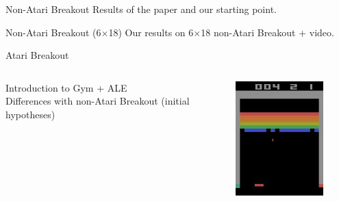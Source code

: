 \documentclass[10pt]{beamer}
\begin{document}
    \begin{frame}{Non-Atari Breakout}
        Results of the paper and our starting point.
    \end{frame}

    \begin{frame}{Non-Atari Breakout (6$\times$18)}
        Our results on 6$\times$18 non-Atari Breakout + video.
    \end{frame}

    \begin{frame}{Atari Breakout}
        \begin{columns}[c,onlytextwidth]
                Introduction to Gym + ALE\\
                Differences with non-Atari Breakout (initial hypotheses)
                \begin{figure}
                    \includegraphics[width=\textwidth]{images/gym-breakout-image-example.jpg}
                \end{figure}
        \end{columns}
    \end{frame}
\end{document}
